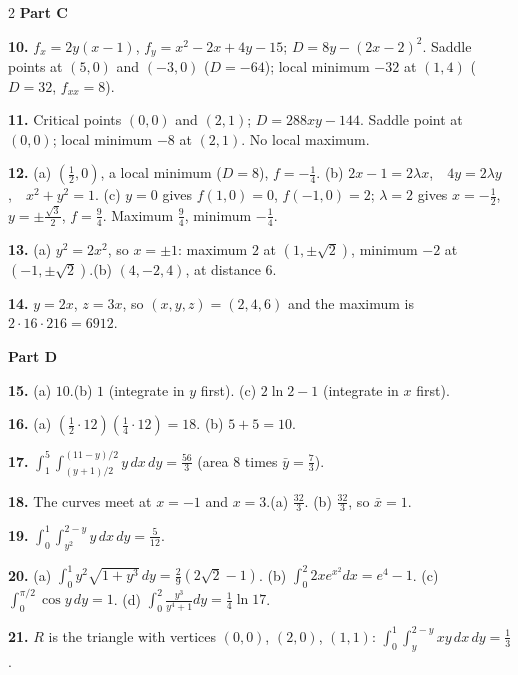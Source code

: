 \documentclass[11pt,oneside]{article}
\begin{document}
{\begin{multicols}{2}
\vspace{4pt}
\textbf{Part C}\par\vspace{2pt}

\textbf{10.} $f_x=2y(x-1)$, $f_y=x^{2}-2x+4y-15$; $D=8y-(2x-2)^{2}$. Saddle points at $(5,0)$
and $(-3,0)$ ($D=-64$); local minimum $-32$ at $(1,4)$ ($D=32$, $f_{xx}=8$).

\textbf{11.} Critical points $(0,0)$ and $(2,1)$; $D=288xy-144$. Saddle point at $(0,0)$;
local minimum $-8$ at $(2,1)$. No local maximum.

\textbf{12.} (a) $\left(\tfrac12,0\right)$, a local minimum ($D=8$), $f=-\tfrac14$.\quad
(b) $2x-1=2\lambda x$,\ \ $4y=2\lambda y$,\ \ $x^{2}+y^{2}=1$.\quad
(c) $y=0$ gives $f(1,0)=0$, $f(-1,0)=2$; $\lambda=2$ gives $x=-\tfrac12$,
$y=\pm\tfrac{\sqrt3}{2}$, $f=\tfrac94$. Maximum $\tfrac94$, minimum $-\tfrac14$.

\textbf{13.} (a) $y^{2}=2x^{2}$, so $x=\pm1$: maximum $2$ at $(1,\pm\sqrt2)$, minimum $-2$ at
$(-1,\pm\sqrt2)$.\quad (b) $(4,-2,4)$, at distance $6$.

\textbf{14.} $y=2x$, $z=3x$, so $(x,y,z)=(2,4,6)$ and the maximum is $2\cdot16\cdot216=6912$.

\vspace{4pt}
\textbf{Part D}\par\vspace{2pt}

\textbf{15.} (a) $10$.\quad (b) $1$ (integrate in $y$ first).\quad
(c) $2\ln2-1$ (integrate in $x$ first).

\textbf{16.} (a) $\left(\tfrac12\cdot12\right)\left(\tfrac14\cdot12\right)=18$.\quad
(b) $5+5=10$.

\textbf{17.} $\displaystyle\int_1^5\!\!\int_{(y+1)/2}^{(11-y)/2}y\,dx\,dy=\tfrac{56}{3}$
(area $8$ times $\bar y=\tfrac73$).

\textbf{18.} The curves meet at $x=-1$ and $x=3$.\quad (a) $\tfrac{32}{3}$.\quad
(b) $\tfrac{32}{3}$, so $\bar x=1$.

\textbf{19.} $\displaystyle\int_0^1\!\!\int_{y^{2}}^{2-y}y\,dx\,dy=\tfrac{5}{12}$.

\textbf{20.} (a) $\int_0^1y^{2}\sqrt{1+y^{3}}\,dy=\tfrac29\left(2\sqrt2-1\right)$.\quad
(b) $\int_0^2 2xe^{x^{2}}dx=e^{4}-1$.\quad
(c) $\int_0^{\pi/2}\cos y\,dy=1$.\quad
(d) $\int_0^2\frac{y^{3}}{y^{4}+1}dy=\tfrac14\ln17$.

\textbf{21.} $R$ is the triangle with vertices $(0,0)$, $(2,0)$, $(1,1)$:
$\displaystyle\int_0^1\!\!\int_y^{2-y}xy\,dx\,dy=\tfrac13$.


\end{multicols}}
\end{document}
